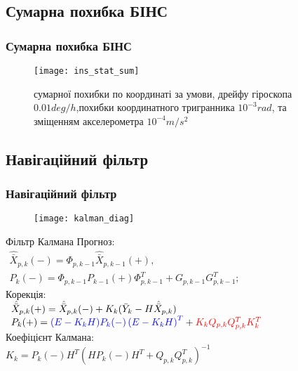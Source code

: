 \documentclass[ucs]{beamer}    %
\begin{document}
\subsection{Сумарна похибка БІНС} 
\begin{frame}[plain]
\frametitle{Сумарна похибка БІНС}
\begin{figure}[l]
\texttt{[image: ins\_stat\_sum]}
\caption{ сумарної похибки по координаті за умови,
дрейфу гіроскопа   $0.01 deg/h$,похибки координатного тригранника $10^{-3} rad$, та зміщенням акселерометра $10^{-4} m/s^2$}
\label{fig:sdins2}
\end{figure}
\end{frame}

\subsection{Навігаційний фільтр} 
\begin{frame}[plain]
\frametitle{Навігаційний фільтр}
\begin{figure}[l]
\texttt{[image: kalman\_diag]}
\end{figure}
\begin{block}{Фільтр Калмана}
\small
Прогноз: \\
$\begin{array}{l} 
{\hat{\bar{X}}_{p,k}(-) =\Phi_{p,k-1} \hat{\bar{X}}_{p,k-1}(+) ,} \\ 
{P_{k}(-) =\Phi_{p,k-1} P_{k-1}(+) \Phi ^{T}_{p,k-1} +G_{p,k-1} G_{p,k-1}^{T} ;} \end{array} $ \\
Корекція:\\
$\begin{array}{l} 
{\hat{\bar{X}}_{p,k}(+)=\hat{\bar{X}}_{p,k}(-) + K_{k} (\bar{Y}_{k} -H\hat{\bar{X}}_{p,k} )} \\ 
{P_{k}(+)={\color{blue}(E-K_{k} H)P_{k}(-) \left(E-K_{k} H\right)^{T}} +{\color{red} K_{k} Q_{p,k} Q_{p,k} ^{T} K_{k}^{T}} } 
\end{array} $ \\
Коефіцієнт Калмана:\\
$K_{k} =P_{k}(-) H^{T} (HP_{k}(-) H^{T} +Q_{p,k} Q_{p,k} ^{T} )^{-1} $
\end{block}
\end{frame}
\end{document}
